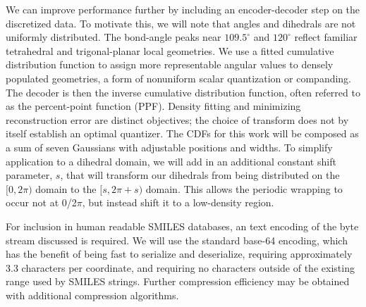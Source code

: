 \documentclass[%
 preprint,
superscriptaddress,
 amsmath,amssymb,
 aip,
 jcp,
]{revtex4-2}
\begin{document}
We can improve performance further by including an encoder-decoder step on the discretized data.
To motivate this, we will note that angles and dihedrals are not uniformly distributed.
The bond-angle peaks near $109.5^\circ$ and $120^\circ$ reflect familiar tetrahedral and trigonal-planar local geometries.
We use a fitted cumulative distribution function to assign more representable angular values to densely populated geometries, a form of nonuniform scalar quantization or companding.\cite{Bennett1948QuantizedSignals}
The decoder is then the inverse cumulative distribution function, often referred to as the percent-point function (PPF).
Density fitting and minimizing reconstruction error are distinct objectives; the choice of transform does not by itself establish an optimal quantizer.\cite{Lloyd1982ScalarQuantization}
The CDFs for this work will be composed as a sum of seven Gaussians with adjustable positions and widths.
To simplify application to a dihedral domain, we will add in an additional constant shift parameter, $s$, that will transform our dihedrals from being distributed on the $[0, 2\pi)$ domain to the $[s, 2\pi + s)$ domain.
This allows the periodic wrapping to occur not at 0/2$\pi$, but instead shift it to a low-density region.

For inclusion in human readable SMILES databases, an text encoding of the byte stream discussed is required.
We will use the standard base-64 encoding, which has the benefit of being fast to serialize and deserialize, requiring approximately 3.3 characters per coordinate, and requiring no characters outside of the existing range used by SMILES strings.
Further compression efficiency may be obtained with additional compression algorithms.

\end{document}

